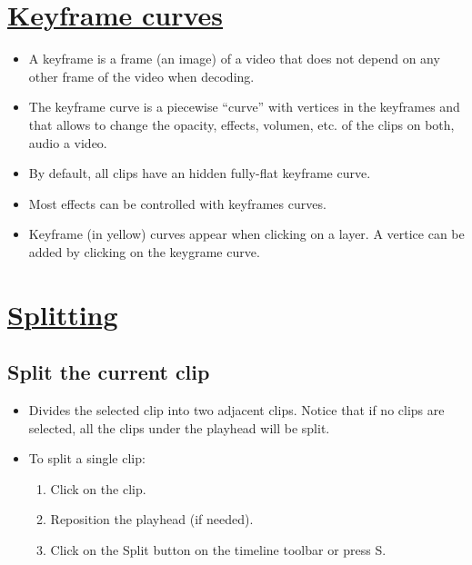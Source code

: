 

\chapter{\href{http://www.pitivi.org/manual/keyframecurves.html}{Keyframe curves}}

\begin{itemize}
\item A keyframe is a frame (an image) of a video that does not depend
  on any other frame of the video when decoding.
\item The keyframe curve is a piecewise ``curve'' with vertices in the
  keyframes and that allows to change the opacity, effects, volumen,
  etc. of the clips on both, audio a video.
\item By default, all clips have an hidden fully-flat keyframe curve.
\item Most effects can be controlled with keyframes curves.
\item Keyframe (in yellow) curves appear when clicking on a layer. A vertice can be added by clicking on the keygrame curve.
\end{itemize}


\chapter{\href{http://www.pitivi.org/manual/splitting.html}{Splitting}}

\section{Split the current clip}

\begin{itemize}
\item Divides the selected clip into two adjacent clips. Notice that
  if no clips are selected, all the clips under the playhead will be
  split.
\item To split a single clip:
\begin{enumerate}
\item Click on the clip.
\item Reposition the playhead (if needed).
\item Click on the Split button on the timeline toolbar or press S.
\end{enumerate}
\end{itemize}

